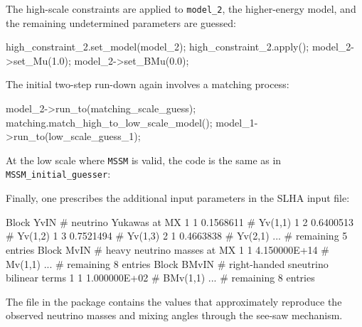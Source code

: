 \documentclass[final,3p,11pt,pdflatex]{elsarticle}
\newcommand{\code}[1]{\lstinline|#1|}  %
\begin{document}
The high-scale constraints are applied to \code{model_2},
the higher-energy model,
and the remaining undetermined parameters are guessed:
\begin{numlstlisting}[name=MSSM_MSSMRHN_two_scale_initial_guesser.cpp]
  high_constraint_2.set_model(model_2);
  high_constraint_2.apply();
  model_2->set_Mu(1.0); model_2->set_BMu(0.0);
\end{numlstlisting}
The initial two-step run-down again involves a matching process:
\begin{numlstlisting}[name=MSSM_MSSMRHN_two_scale_initial_guesser.cpp]
  model_2->run_to(matching_scale_guess);
  matching.match_high_to_low_scale_model();
  model_1->run_to(low_scale_guess_1);
\end{numlstlisting}
At the low scale where \code{MSSM} is valid,
the code is the same as in \code{MSSM_initial_guesser}:
\begin{numlstlisting}[name=MSSM_MSSMRHN_two_scale_initial_guesser.cpp]
  model_1->solve_ewsb_tree_level();
  model_1->calculate_DRbar_parameters();
  model_1->set_thresholds(3); model_1->set_loops(2);
}
\end{numlstlisting}

Finally,
one prescribes the additional input parameters in the SLHA input file:
\begin{numlstlisting}
Block YvIN                   # neutrino Yukawas at MX
1 1  0.1568611               # Yv(1,1)
1 2  0.6400513               # Yv(1,2)
1 3  0.7521494               # Yv(1,3)
2 1  0.4663838               # Yv(2,1)
...                          # remaining 5 entries
Block MvIN                   # heavy neutrino masses at MX
1 1  4.150000E+14            # Mv(1,1)
...                          # remaining 8 entries
Block BMvIN                  # right-handed sneutrino bilinear terms
1 1  1.000000E+02            # BMv(1,1)
...                          # remaining 8 entries
\end{numlstlisting}
The file in the package contains the values that approximately reproduce
the observed neutrino masses and mixing angles
\cite{Beringer:1900zz}
through the see-saw mechanism.
\end{document}
